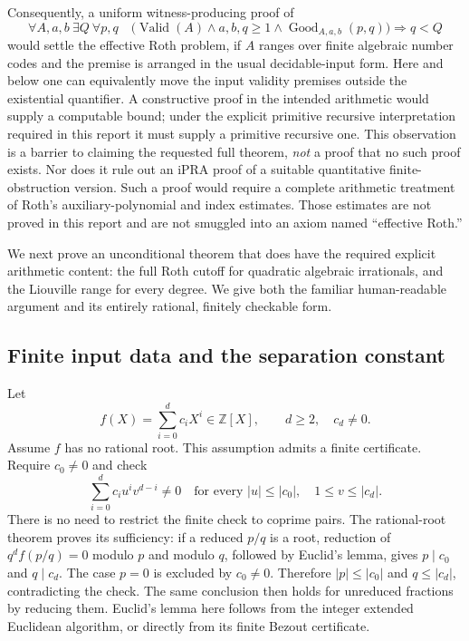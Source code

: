 Consequently, a uniform witness-producing proof of
\begin{equation}\label{eq:effective-roth-target}
 \forall A,a,b\ \exists Q\ \forall p,q\quad
 \bigl(\operatorname{Valid}(A)\wedge a,b,q\geq1
       \wedge\operatorname{Good}_{A,a,b}(p,q)\bigr)\Longrightarrow q<Q
\end{equation}
would settle the effective Roth problem, if $A$ ranges over finite algebraic
number codes and the premise is arranged in the usual decidable-input form.
Here and below one can equivalently move the input validity premises outside
the existential quantifier.  A constructive proof in the intended arithmetic
would supply a computable bound; under the explicit primitive recursive
interpretation required in this report it must supply a primitive recursive
one.  This observation is a barrier to claiming the requested full theorem,
\emph{not} a proof that no such proof exists.  Nor does it rule out an iPRA
proof of a suitable quantitative finite-obstruction version.  Such a proof
would require a complete arithmetic treatment of Roth's auxiliary-polynomial
and index estimates.  Those estimates are not proved in this report and are
not smuggled into an axiom named ``effective Roth.''

We next prove an unconditional theorem that does have the required explicit
arithmetic content: the full Roth cutoff for quadratic algebraic irrationals,
and the Liouville range for every degree.  We give both the familiar
human-readable argument and its entirely rational, finitely checkable form.

\subsection{Finite input data and the separation constant}

Let
\[
 f(X)=\sum_{i=0}^{d}c_iX^i\in\mathbb Z[X],\qquad d\geq2,\quad c_d\ne0.
\]
Assume $f$ has no rational root.  This assumption admits a finite certificate.
Require $c_0\ne0$ and check
\begin{equation}\label{eq:no-root-certificate}
 \sum_{i=0}^{d}c_i u^i v^{d-i}\ne0
 \quad\text{for every } |u|\leq |c_0|,\quad 1\leq v\leq |c_d|.
\end{equation}
There is no need to restrict the finite check to coprime pairs.  The
rational-root theorem proves its sufficiency: if a reduced $p/q$ is a root,
reduction of $q^df(p/q)=0$ modulo $p$ and modulo $q$, followed by Euclid's
lemma, gives $p\mid c_0$ and $q\mid c_d$.  The case $p=0$ is excluded by
$c_0\ne0$.  Therefore $|p|\leq|c_0|$ and $q\leq|c_d|$, contradicting the
check.  The same conclusion then holds for unreduced fractions by reducing
them.  Euclid's lemma here follows from the integer extended Euclidean
algorithm, or directly from its finite Bezout certificate.

